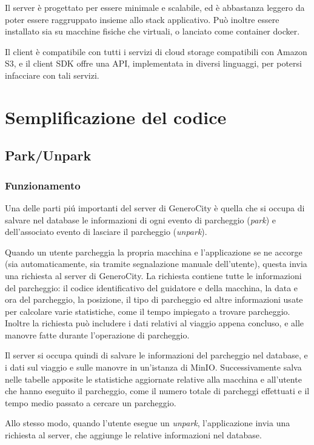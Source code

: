 \documentclass[italian, oneside]{sapthesis} %
\begin{document}
	Il server \`e progettato per essere minimale e scalabile, ed \`e abbastanza leggero da poter essere raggruppato insieme allo stack applicativo. Pu\`o inoltre essere installato sia su macchine fisiche che virtuali, o lanciato come container docker.

	Il client \`e compatibile con tutti i servizi di cloud storage compatibili con Amazon S3, e il client SDK offre una API, implementata in diversi linguaggi, per potersi infacciare con tali servizi. 


\chapter{Semplificazione del codice}
	\section{Park/Unpark}
		\subsection{Funzionamento}
		Una delle parti pi\'u importanti del server di GeneroCity \`e quella che si occupa di salvare nel database le informazioni di ogni evento di parcheggio (\textit{park}) e dell'associato evento di lasciare il parcheggio (\textit{unpark}).
		
		Quando un utente parcheggia la propria macchina e l'applicazione se ne accorge (sia automaticamente, sia tramite segnalazione manuale dell'utente), questa invia una richiesta al server di GeneroCity. La richiesta contiene tutte le informazioni del parcheggio: il codice identificativo del guidatore e della macchina, la data e ora del parcheggio, la posizione, il tipo di parcheggio ed altre informazioni usate per calcolare varie statistiche, come il tempo impiegato a trovare parcheggio. Inoltre la richiesta pu\`o includere i dati relativi al viaggio appena concluso, e alle manovre fatte durante l'operazione di parcheggio.

		Il server si occupa quindi di salvare le informazioni del parcheggio nel database, e i dati sul viaggio e sulle manovre in un'istanza di MinIO. Successivamente salva nelle tabelle apposite le statistiche aggiornate relative alla macchina e all'utente che hanno eseguito il parcheggio, come il numero totale di parcheggi effettuati e il tempo medio passato a cercare un parcheggio.

		Allo stesso modo, quando l'utente esegue un \textit{unpark}, l'applicazione invia una richiesta al server, che aggiunge le relative informazioni nel database.
\end{document}
